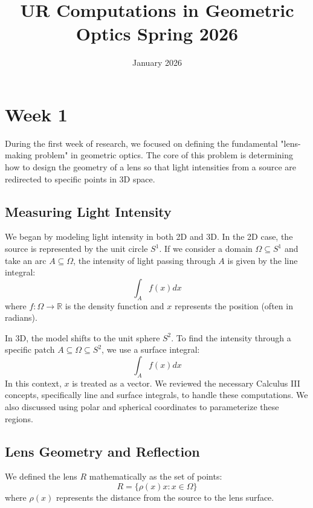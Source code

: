 \documentclass{article}
\title{UR Computations in Geometric Optics Spring 2026}
\date{January 2026}
\begin{document}
\maketitle

\section{Week 1}

During the first week of research, we focused on defining the fundamental "lens-making problem" in geometric optics. The core of this problem is determining how to design the geometry of a lens so that light intensities from a source are redirected to specific points in 3D space. 

\subsection{Measuring Light Intensity}
We began by modeling light intensity in both 2D and 3D. In the 2D case, the source is represented by the unit circle $S^1$. If we consider a domain $\Omega \subseteq S^1$ and take an arc $A \subseteq \Omega$, the intensity of light passing through $A$ is given by the line integral:
\[ \int_A f(x) dx \]
where $f: \Omega \to \mathbb{R}$ is the density function and $x$ represents the position (often in radians). 

In 3D, the model shifts to the unit sphere $S^2$. To find the intensity through a specific patch $A \subseteq \Omega \subseteq S^2$, we use a surface integral:
\[ \int_A f(x) dx \]
In this context, $x$ is treated as a vector. We reviewed the necessary Calculus III concepts, specifically line and surface integrals, to handle these computations. We also discussed using polar and spherical coordinates to parameterize these regions.

\subsection{Lens Geometry and Reflection}
We defined the lens $R$ mathematically as the set of points:
\[ R = \{ \rho(x)x : x \in \Omega \} \]
where $\rho(x)$ represents the distance from the source to the lens surface.
\end{document}
